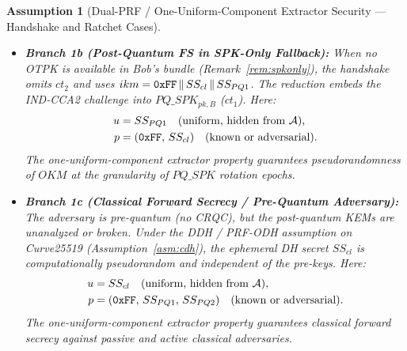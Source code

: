 \documentclass[11pt,a4paper]{article}
\theoremstyle{remark}
\theoremstyle{plain}
\newtheorem{assumption}[theorem]{Assumption}
\newcommand{\hexlit}[1]{\text{\upshape\texttt{#1}}}
\begin{document}
\begin{assumption}[Dual-PRF / One-Uniform-Component Extractor Security — Handshake and Ratchet Cases]
\begin{itemize}
        and the uniform secret $u = SS_{PQ2}$ enters as a suffix of $ikm = p \,\|\, u$, HMAC is evaluated
        with a fixed key and partially uniform message input.  While standard dual-PRF theorems (e.g., \cite{krawczyk2010hkdf})
        model HMAC when the uniform component occupies the key position, concatenated multi-input extraction under public
        salt requires treating HMAC as a computational entropy extractor over partially known inputs (Definition~\ref{def:kdf-hi}).
        This is an idealized computational assumption, stronger than standard secret-key PRF security, which we state explicitly
        to formalize the post-quantum forward secrecy reduction.
  \item \textbf{Branch 1b (Post-Quantum FS in SPK-Only Fallback):}
        When no OTPK is available in Bob's bundle (Remark~\ref{rem:spkonly}), the handshake omits
        $ct_2$ and uses $ikm = \hexlit{0xFF} \,\|\, SS_{cl} \,\|\, SS_{PQ1}$.  The reduction embeds
        the IND-CCA2 challenge into $PQ\_SPK_{pk,B}$ ($ct_1$).  Here:
        \begin{align*}
          u &= SS_{PQ1} \quad \text{(uniform, hidden from $\mathcal{A}$)}, \\
          p &= (\hexlit{0xFF},\, SS_{cl}) \quad \text{(known or adversarial)}.
        \end{align*}
        The one-uniform-component extractor property guarantees pseudorandomness of $OKM$ at the
        granularity of $PQ\_SPK$ rotation epochs.
  \item \textbf{Branch 1c (Classical Forward Secrecy / Pre-Quantum Adversary):}
        The adversary is pre-quantum (no CRQC), but the post-quantum KEMs are unanalyzed or broken.
        Under the DDH / PRF-ODH assumption on Curve25519 (Assumption~\ref{asm:cdh}), the ephemeral DH secret
        $SS_{cl}$ is computationally pseudorandom and independent of the pre-keys.  Here:
        \begin{align*}
          u &= SS_{cl} \quad \text{(uniform, hidden from $\mathcal{A}$)}, \\
          p &= (\hexlit{0xFF},\, SS_{PQ1},\, SS_{PQ2}) \quad \text{(known or adversarial)}.
        \end{align*}
        The one-uniform-component extractor property guarantees classical forward secrecy against
        passive and active classical adversaries.
\end{itemize}


\end{assumption}
\end{document}
